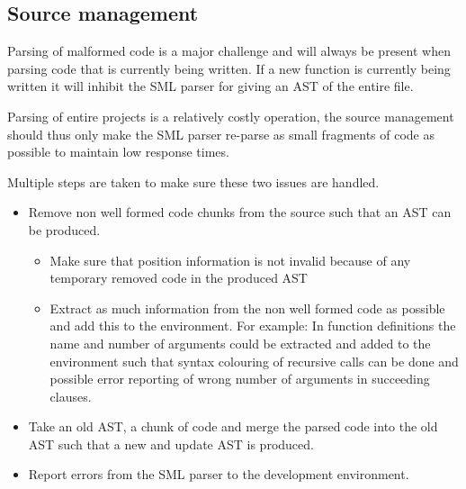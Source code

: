 \subsection{Source management}
Parsing of malformed code is a major challenge and will always be present when
parsing code that is currently being written. If a new function is currently
being written it will inhibit the SML parser for giving an AST of the entire
file.

Parsing of entire projects is a relatively costly operation, the source
management should thus only make the SML parser re-parse as small fragments of
code as possible to maintain low response times.

Multiple steps are taken to make sure these two issues are handled.

\begin{itemize}
\item Remove non well formed code chunks from the source such that an AST can be
  produced.
  \begin{itemize}
  \item Make sure that position information is not invalid because of any
    temporary removed code in the produced AST
  \item Extract as much information from the non well formed code as possible
    and add this to the environment. For example: In function definitions the
    name and number of arguments could be extracted and added to the environment
    such that syntax colouring of recursive calls can be done and possible error
    reporting of wrong number of arguments in succeeding clauses.
  \end{itemize}

\item Take an old AST, a chunk of code and merge the parsed code into
  the old AST such that a new and update AST is produced.

\item Report errors from the SML parser to the development environment.

\end{itemize}



